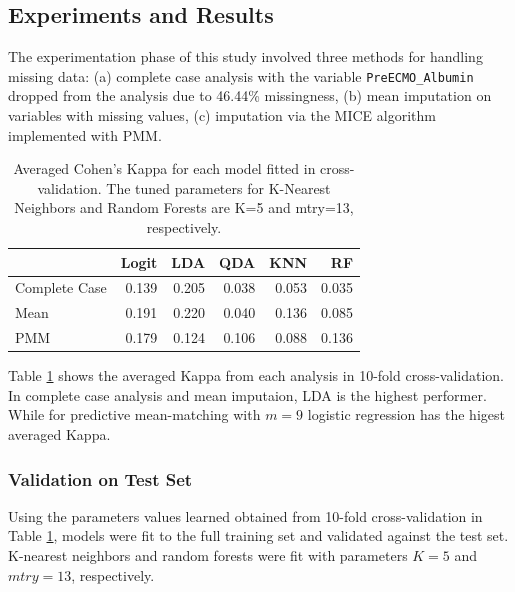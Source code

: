 \documentclass[12pt,]{article}
\begin{document}
\subsection{Experiments and Results}\label{experiments-and-results}

The experimentation phase of this study involved three methods for
handling missing data: (a) complete case analysis with the variable
\texttt{PreECMO\_Albumin} dropped from the analysis due to 46.44\%
missingness, (b) mean imputation on variables with missing values, (c)
imputation via the MICE algorithm implemented with PMM.

\begin{table}[!h]

\caption{\label{tab:cv-kappa}\label{tab:cv-kappa} Averaged Cohen's Kappa for each model fitted in cross-validation.  The tuned parameters for K-Nearest Neighbors and Random Forests are K=5 and mtry=13, respectively.}
\centering
\fontsize{10}{12}\selectfont
\begin{tabular}{lrrrrr}
\toprule
  & Logit & LDA & QDA & KNN & RF\\
\midrule
Complete Case & 0.139 & 0.205 & 0.038 & 0.053 & 0.035\\
Mean & 0.191 & 0.220 & 0.040 & 0.136 & 0.085\\
PMM & 0.179 & 0.124 & 0.106 & 0.088 & 0.136\\
\bottomrule
\end{tabular}
\end{table}

Table \ref{tab:cv-kappa} shows the averaged Kappa from each analysis in
10-fold cross-validation. In complete case analysis and mean imputaion,
LDA is the highest performer. While for predictive mean-matching with
\(m=9\) logistic regression has the higest averaged Kappa.

\subsubsection{Validation on Test Set}\label{validation-on-test-set}

Using the parameters values learned obtained from 10-fold
cross-validation in Table \ref{tab:cv-kappa}, models were fit to the
full training set and validated against the test set. K-nearest
neighbors and random forests were fit with parameters \(K=5\) and
\(mtry=13\), respectively.
\end{document}
